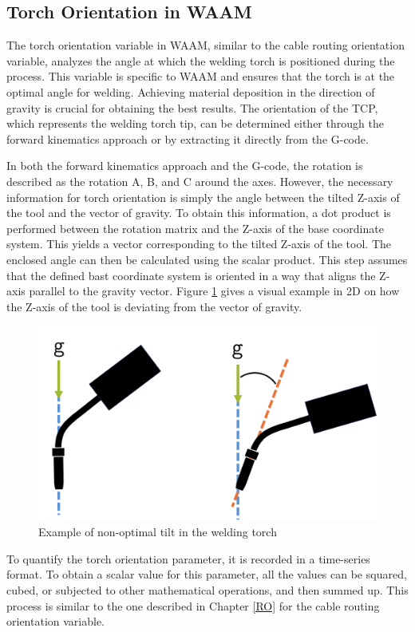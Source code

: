   

\subsection{Torch Orientation in WAAM}
The torch orientation variable in \acrshort{WAAM}, similar to the cable routing orientation variable, analyzes the angle at which the welding torch is positioned during the process. This variable is specific to \acrshort{WAAM} and ensures that the torch is at the optimal angle for welding. Achieving material deposition in the direction of gravity is crucial for obtaining the best results. The orientation of the \acrshort{TCP}, which represents the welding torch tip, can be determined either through the forward kinematics approach or by extracting it directly from the G-code.

In both the forward kinematics approach and the G-code, the rotation is described as the rotation A, B, and C around the axes. However, the necessary information for torch orientation is simply the angle between the tilted Z-axis of the tool and the vector of gravity. To obtain this information, a dot product is performed between the rotation matrix and the Z-axis of the base coordinate system. This yields a vector corresponding to the tilted Z-axis of the tool. The enclosed angle can then be calculated using the scalar product. This step assumes that the defined bast coordinate system is oriented in a way that aligns the Z-axis parallel to the gravity vector. Figure \ref{tilt} gives a visual example in 2D on how the Z-axis of the tool is deviating from the vector of gravity.

\begin{figure}[H]
	\centerline{\includegraphics[width=.45\textwidth]{figures/ttilt.png}}
	\caption{Example of non-optimal tilt in the welding torch}
	\label{tilt}
\end{figure}

To quantify the torch orientation parameter, it is recorded in a time-series format. To obtain a scalar value for this parameter, all the values can be squared, cubed, or subjected to other mathematical operations, and then summed up. This process is similar to the one described in Chapter \ref{RO} for the cable routing orientation variable.




